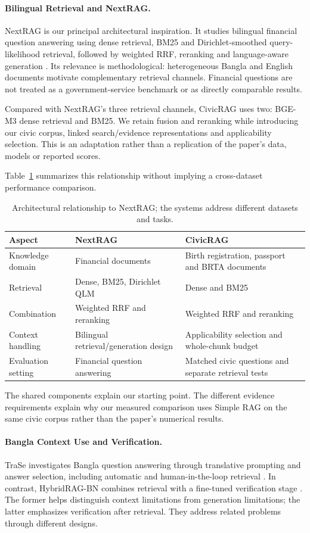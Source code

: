 \paragraph{Bilingual Retrieval and NextRAG.}
NextRAG is our principal architectural inspiration. It studies bilingual financial question answering using dense retrieval, BM25 and Dirichlet-smoothed query-likelihood retrieval, followed by weighted RRF, reranking and language-aware generation \cite{nextrag}. Its relevance is methodological: heterogeneous Bangla and English documents motivate complementary retrieval channels. Financial questions are not treated as a government-service benchmark or as directly comparable results.

Compared with NextRAG's three retrieval channels, CivicRAG uses two: BGE-M3 dense retrieval and BM25. We retain fusion and reranking while introducing our civic corpus, linked search/evidence representations and applicability selection. This is an adaptation rather than a replication of the paper's data, models or reported scores.

Table~\ref{tab:related-design} summarizes this relationship without implying a cross-dataset performance comparison.
\begin{table}[htbp]\centering\small
\caption{Architectural relationship to NextRAG; the systems address different datasets and tasks.}\label{tab:related-design}
\begin{tabularx}{\linewidth}{p{28mm}XX}\toprule
Aspect & NextRAG & CivicRAG\\\midrule
Knowledge domain & Financial documents & Birth registration, passport and BRTA documents\\
Retrieval & Dense, BM25, Dirichlet QLM & Dense and BM25\\
Combination & Weighted RRF and reranking & Weighted RRF and reranking\\
Context handling & Bilingual retrieval/generation design & Applicability selection and whole-chunk budget\\
Evaluation setting & Financial question answering & Matched civic questions and separate retrieval tests\\\bottomrule
\end{tabularx}\end{table}
The shared components explain our starting point. The different evidence requirements explain why our measured comparison uses Simple RAG on the same civic corpus rather than the paper's numerical results.

\paragraph{Bangla Context Use and Verification.}
TraSe investigates Bangla question answering through translative prompting and answer selection, including automatic and human-in-the-loop retrieval \cite{trase}. In contrast, HybridRAG-BN combines retrieval with a fine-tuned verification stage \cite{hybridragbn}. The former helps distinguish context limitations from generation limitations; the latter emphasizes verification after retrieval. They address related problems through different designs.


